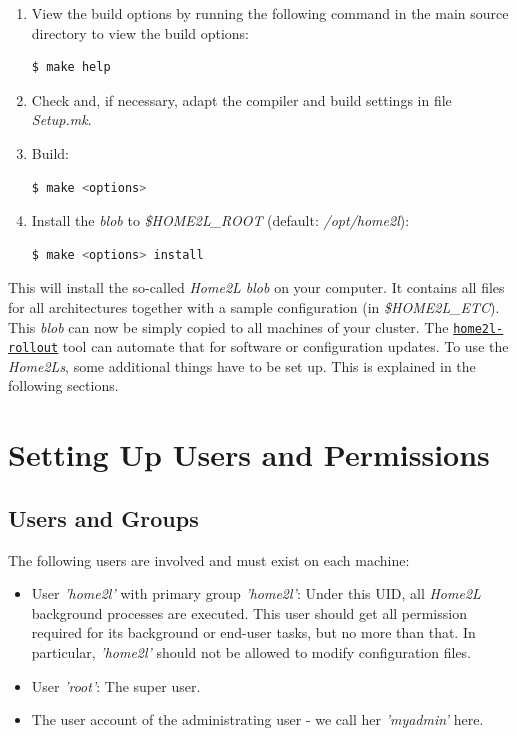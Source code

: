 \documentclass[12pt,english,parskip=half,headheight=19pt]{scrreprt}
\newcommand{\idx}[1]{#1\index{#1}}
\newcommand{\reftool}[1]{\hyperref[tool:#1]{\texttt{\idx{#1}}}}
\begin{document}
\begin{enumerate}
\item
  View the build options by running the following command in the main
  source directory to view the build options:
  \begin{lstlisting}[language=bash]
    $ make help
  \end{lstlisting}
\item
  Check and, if necessary, adapt the compiler and build settings in file \textit{Setup.mk}.
\item
  Build:
  \begin{lstlisting}[language=bash]
    $ make <options>
  \end{lstlisting}
\item
  Install the \textit{blob} to \textit{\$HOME2L\_ROOT} (default: \textit{/opt/home2l}):
  \begin{lstlisting}[language=bash]
    $ make <options> install
  \end{lstlisting}
\end{enumerate}

This will install the so-called \textit{Home2L blob} on your computer. It
contains all files for all architectures together with a sample
configuration (in \textit{\$HOME2L\_ETC}). This \textit{blob} can now be simply
copied to all machines of your cluster. The \reftool{home2l-rollout} tool
can automate that for software or configuration updates.
To use the \textit{Home2Ls}, some additional things have to be set up.
This is explained in the following sections.





\section{Setting Up Users and Permissions}
\label{sec:installing-users}



\subsection{Users and Groups}

The following users are involved and must exist on each machine:

\begin{itemize}
\item
  User \textit{'home2l'} with primary group \textit{'home2l'}: Under this
  UID, all \textit{Home2L} background processes are executed. This user should get
  all permission required for its background or end-user tasks, but no more than that.
  In particular, \textit{'home2l'} should not be allowed to modify configuration files.
\item
  User \textit{'root'}: The super user.
\item
  The user account of the administrating user - we call her \textit{'myadmin'} here.
\end{itemize}
\end{document}
